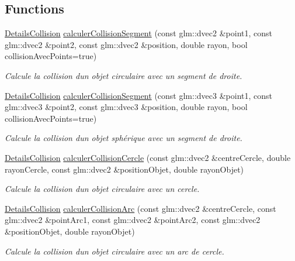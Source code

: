 \subsection*{Functions}
\begin{DoxyCompactItemize}
\item 
\hyperlink{classaidecollision_1_1_details_collision}{Details\+Collision} \hyperlink{namespaceaidecollision_a778ea767a466a333017247d9cb63d1e4}{calculer\+Collision\+Segment} (const glm\+::dvec2 \&point1, const glm\+::dvec2 \&point2, const glm\+::dvec2 \&position, double rayon, bool collision\+Avec\+Points=true)
\begin{DoxyCompactList}\small\item\em Calcule la collision d\textquotesingle{}un objet circulaire avec un segment de droite. \end{DoxyCompactList}\item 
\hyperlink{classaidecollision_1_1_details_collision}{Details\+Collision} \hyperlink{namespaceaidecollision_a21b6909881ded08e749cd878bb2f860f}{calculer\+Collision\+Segment} (const glm\+::dvec3 \&point1, const glm\+::dvec3 \&point2, const glm\+::dvec3 \&position, double rayon, bool collision\+Avec\+Points=true)
\begin{DoxyCompactList}\small\item\em Calcule la collision d\textquotesingle{}un objet sphérique avec un segment de droite. \end{DoxyCompactList}\item 
\hyperlink{classaidecollision_1_1_details_collision}{Details\+Collision} \hyperlink{namespaceaidecollision_a38ff38a31eac6fa58d2ed35aedc4ed57}{calculer\+Collision\+Cercle} (const glm\+::dvec2 \&centre\+Cercle, double rayon\+Cercle, const glm\+::dvec2 \&position\+Objet, double rayon\+Objet)
\begin{DoxyCompactList}\small\item\em Calcule la collision d\textquotesingle{}un objet circulaire avec un cercle. \end{DoxyCompactList}\item 
\hyperlink{classaidecollision_1_1_details_collision}{Details\+Collision} \hyperlink{namespaceaidecollision_a3d5b4f5dcf2ccb0ea9fd08a947949a6d}{calculer\+Collision\+Arc} (const glm\+::dvec2 \&centre\+Cercle, const glm\+::dvec2 \&point\+Arc1, const glm\+::dvec2 \&point\+Arc2, const glm\+::dvec2 \&position\+Objet, double rayon\+Objet)
\begin{DoxyCompactList}\small\item\em Calcule la collision d\textquotesingle{}un objet circulaire avec un arc de cercle. \end{DoxyCompactList}\item 

\end{DoxyCompactItemize}
